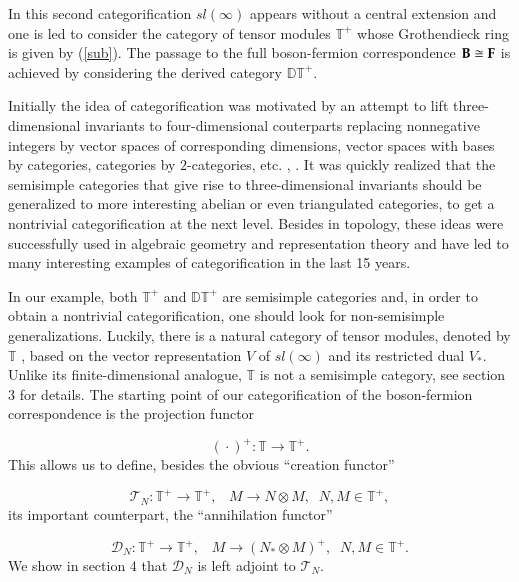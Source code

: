 \documentclass[11pt]{amsart}
\begin{document}
In this second categorification $sl(\infty)$  appears without a central extension and one is led to 
consider the category of tensor modules $\mathbb{T}^+$ whose Grothendieck ring is given by (\ref{sub}). 
The passage to the full boson-fermion correspondence $\bold{B} \cong \bold{F}$ is achieved by considering the 
derived category $\mathbb{DT}^+$.

Initially the idea of categorification was motivated by an attempt to lift three-dimensional 
invariants to four-dimensional couterparts replacing nonnegative integers by vector spaces of corresponding 
dimensions, vector spaces with bases by categories, categories by $2$-categories, etc. \cite{CF}, \cite{K1}.
It was quickly realized that the semisimple categories that give rise to three-dimensional invariants should be
generalized to more interesting abelian or even triangulated categories, to get a nontrivial categorification 
at the next level. Besides in topology, these ideas were successfully used in algebraic geometry and 
representation theory and have led to many interesting examples of categorification in the last 15 years.

In our example, both $\mathbb{T}^+$ and $\mathbb{DT}^+$ are semisimple categories and, in order to obtain
a nontrivial categorification, one should look for non-semisimple generalizations. Luckily, there is a 
natural category of tensor modules, denoted by $\mathbb{T}$ \cite{DPS}, based on the vector representation 
$V$ of $sl(\infty)$ and its restricted dual $V_*$. Unlike its finite-dimensional analogue, $\mathbb{T}$ is not a
semisimple category, see section $3$ for details. The starting point of our categorification of the boson-fermion 
correspondence is the projection functor

\begin{equation}\label{projfunct}
 (\mbox{} \cdot \mbox{})^+:\mathbb{T}\rightarrow \mathbb{T}^+.\nonumber
\end{equation}
This allows us to define, besides the obvious ``creation functor''

\begin{equation}\label{funct}
 \mathcal{T}_N : \mathbb{T}^+ \rightarrow \mathbb{T}^+, \;\;\; M \rightarrow N \otimes M,\;\; N,M \in \mathbb{T}^+,\nonumber
\end{equation}
its important counterpart, the ``annihilation functor''

\begin{equation}\label{anfunct}
 \mathcal{D}_N : \mathbb{T}^+ \rightarrow \mathbb{T}^+, \;\;\; M \rightarrow (N_* \otimes M)^+,\;\; N,M \in \mathbb{T}^+.\nonumber
\end{equation}
We show in section $4$ that $ \mathcal{D}_N$ is left adjoint to $\mathcal{T}_N$.
\end{document}
